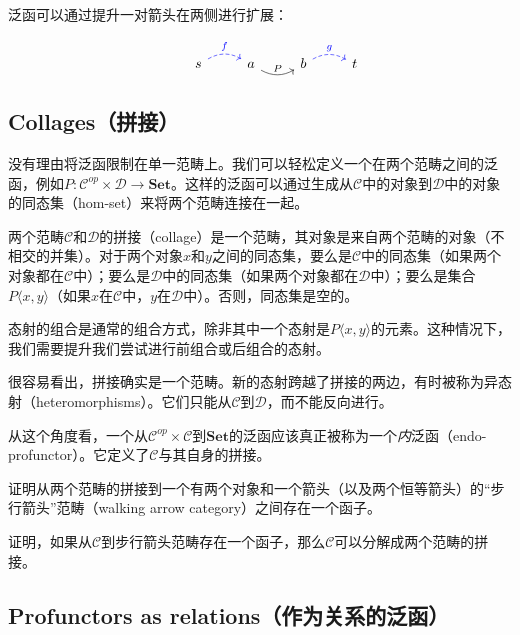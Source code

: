 \documentclass[DaoFP]{subfiles}
\begin{document}
 泛函可以通过提升一对箭头在两侧进行扩展：

 \[
  \begin{tikzcd}
   & s
   \arrow[r, bend left, dashed, blue, "f"]
   & a
   \arrow[r, bend right, "P"]
   & b
   \arrow[r, bend left, dashed, blue, "g"]
   &  t
  \end{tikzcd}
 \]

 \subsection{Collages（拼接）}

 没有理由将泛函限制在单一范畴上。我们可以轻松定义一个在两个范畴之间的泛函，例如$ P \colon \mathcal{C}^{op} \times  \mathcal{D} \to \mathbf{Set}$。这样的泛函可以通过生成从$\mathcal{C}$中的对象到$\mathcal{D}$中的对象的同态集（hom-set）来将两个范畴连接在一起。

 两个范畴$\mathcal{C}$和$\mathcal{D}$的拼接（collage）是一个范畴，其对象是来自两个范畴的对象（不相交的并集）。对于两个对象$x$和$y$之间的同态集，要么是$\mathcal{C}$中的同态集（如果两个对象都在$\mathcal{C}$中）；要么是$\mathcal{D}$中的同态集（如果两个对象都在$\mathcal{D}$中）；要么是集合$P \langle x, y\rangle$（如果$x$在$\mathcal{C}$中，$y$在$\mathcal{D}$中）。否则，同态集是空的。

 态射的组合是通常的组合方式，除非其中一个态射是$P \langle x, y \rangle$的元素。这种情况下，我们需要提升我们尝试进行前组合或后组合的态射。

 很容易看出，拼接确实是一个范畴。新的态射跨越了拼接的两边，有时被称为异态射（heteromorphisms）。它们只能从$\mathcal{C}$到$\mathcal{D}$，而不能反向进行。

 从这个角度看，一个从$ \mathcal{C}^{op} \times  \mathcal{C}$到$\mathbf{Set}$的泛函应该真正被称为一个\emph{内}泛函（endo-profunctor）。它定义了$\mathcal{C}$与其自身的拼接。

 \begin{exercise}
  证明从两个范畴的拼接到一个有两个对象和一个箭头（以及两个恒等箭头）的“步行箭头”范畴（walking arrow category）之间存在一个函子。
 \end{exercise}

 \begin{exercise}
  证明，如果从$\mathcal{C}$到步行箭头范畴存在一个函子，那么$\mathcal{C}$可以分解成两个范畴的拼接。
 \end{exercise}

 \subsection{Profunctors as relations（作为关系的泛函）}
\end{document}

